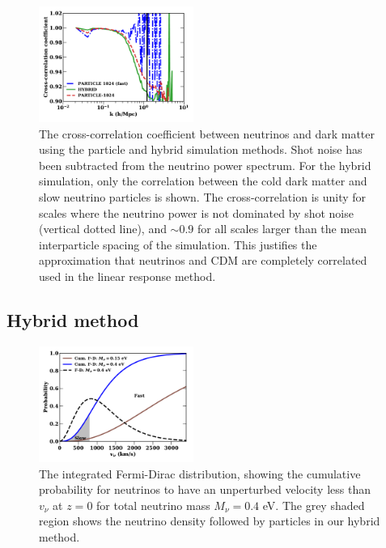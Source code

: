 \documentclass[useAMS, usenatbib]{mnras}
\begin{document}
\begin{figure}
\includegraphics[width=0.45\textwidth]{nuplots/corr_coeff-1.pdf}
  \caption{The cross-correlation coefficient between neutrinos and dark matter using the particle and hybrid simulation methods.
  Shot noise has been subtracted from the neutrino power spectrum. For the hybrid simulation, only the correlation between the
  cold dark matter and slow neutrino particles is shown.
  The cross-correlation is unity for scales where the neutrino power is not dominated by shot noise (vertical dotted line),
  and $\sim 0.9$ for all scales larger than the mean interparticle spacing of the simulation. This justifies the
  approximation that neutrinos and CDM are completely correlated used in the linear response method.
  }
  \label{fig:cross-corr}
\end{figure}

\subsection{Hybrid method}
\label{sec:hybrid}

\begin{figure}
\includegraphics[width=0.45\textwidth]{nuplots/fermidirac.pdf}
  \caption{The integrated Fermi-Dirac distribution, showing the cumulative probability for neutrinos to have an unperturbed velocity less than $v_\nu$ at $z=0$ for total neutrino mass $M_\nu = 0.4$ eV.
  The grey shaded region shows the neutrino density followed by particles in our hybrid method.
  }
  \label{fig:fddistribution}
\end{figure}
\end{document}
